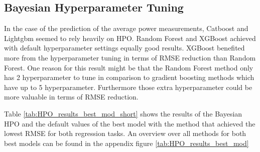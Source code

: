 \documentclass[12pt,a4paper]{article}
\begin{document}
\hypertarget{bayesian-hyperparameter-tuning}{%
\subsection{Bayesian Hyperparameter Tuning}\label{bayesian-hyperparameter-tuning}}

In the case of the prediction of the average power measurements, Catboost and Lightgbm seemed to rely heavily on HPO. Random Forest and XGBoost achieved with default hyperparameter settings equally good results. XGBoost benefited more from the hyperparameter tuning in terms of RMSE reduction than Random Forest. One reason for this result might be that the Random Forest method only has 2 hyperparameter to tune in comparison to gradient boosting methods which have up to 5 hyperparameter. Furthermore those extra hyperparameter could be more valuable in terms of RMSE reduction.

Table \ref{tab:HPO_results_best_mod_short} shows the results of the Bayesian HPO and the default values of the best model with the method that achieved the lowest RMSE for both regression tasks. An overview over all methods for both best models can be found in the appendix figure \ref{tab:HPO_results_best_mod}
\end{document}
